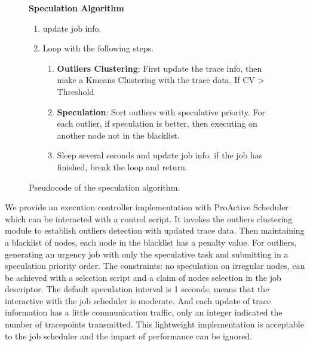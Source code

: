  \begin{figure}
\textbf{Speculation Algorithm}
\begin{enumerate}[(1)]
\setlength{\itemsep}{-\itemsep}
\item update job info.
\item Loop with the following steps.
\begin{enumerate}[]
\setlength{\itemsep}{-\itemsep}
\item \textbf{Outliers Clustering}: First update the trace info, then make a Kmeans Clustering with the trace data. If CV > Threshold
\item \textbf{Speculation}: Sort outliers with speculative priority. For each outlier, if speculation is better, then executing on another node not in the blacklist.
\item Sleep several seconds and update job info. if the job has finished, break the loop and return.
\end{enumerate}
\end{enumerate}
\caption{Pseudocode of the speculation algorithm.}
\label{fig-spec-algo}
\end{figure}

We provide an execution controller implementation with ProActive Scheduler which can be interacted with  a control script. It invokes the outliers clustering module to establish outliers detection with updated trace data. Then maintaining a blacklist of nodes, each node in the blacklist has a penalty value. For outliers, generating an urgency job with only the speculative task and submitting in a speculation priority order. The constraints: no speculation on irregular nodes, can be achieved with a selection script and a claim of nodes selection in the job descriptor. The default speculation interval is 1 seconds, means that the interactive with the job scheduler is moderate. And each update of trace information has a little communication traffic, only an integer indicated the number of  tracepoints transmitted. This lightweight implementation is acceptable to the job scheduler and the impact of performance can be ignored.
